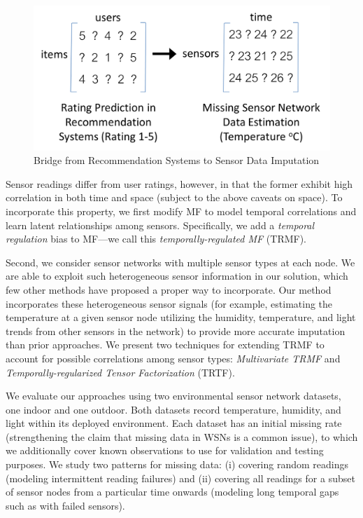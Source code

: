 \begin{figure}[H]
\centering
\includegraphics[scale=0.35]{recommend_imputation.png}
\caption{Bridge from Recommendation Systems to Sensor Data Imputation} 
\label{recommend_imputation}
\end{figure}

Sensor readings differ from user ratings, however, in that the former
exhibit high correlation in both time and space (subject to the above
caveats on space).  To incorporate this property, we first modify MF
to model temporal correlations and learn latent relationships among
sensors.  Specifically, we add a {\em temporal regulation} bias to
MF---we call this {\em temporally-regulated MF} (TRMF).

Second, we consider sensor networks with multiple sensor types at each node.
We are able to exploit such heterogeneous sensor information in our
solution, which few other methods have proposed a proper way to
incorporate.  Our method incorporates these heterogeneous sensor
signals (for example, estimating the temperature at a given sensor
node utilizing the humidity, temperature, and light trends from other
sensors in the network) to provide more accurate imputation than 
prior approaches.  We present two techniques for extending 
TRMF to account for possible correlations among sensor types: {\em Multivariate TRMF} and 
{\em Temporally-regularized Tensor Factorization} (TRTF).

We evaluate our approaches using two environmental sensor network
datasets, one indoor and one outdoor.
Both datasets record temperature, humidity, and light within its deployed
environment.  Each dataset has an initial missing rate (strengthening
the claim that missing data in WSNs is a common issue), to which we
additionally cover known observations to use for validation and
testing purposes.  We study two patterns for missing data: (i) covering
random readings (modeling intermittent reading failures) and (ii)
covering all readings for a subset of sensor nodes from a particular time onwards 
(modeling long temporal gaps such as with failed sensors).

